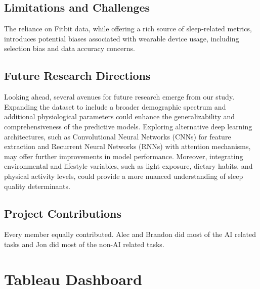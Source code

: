\documentclass[10pt]{extarticle}
\begin{document}



\subsection{Limitations and Challenges}

The reliance on Fitbit data, while offering a rich source of sleep-related metrics, introduces potential biases associated with wearable device usage, including selection bias and data accuracy concerns.

\subsection{Future Research Directions}

Looking ahead, several avenues for future research emerge from our study. Expanding the dataset to include a broader demographic spectrum and additional physiological parameters could enhance the generalizability and comprehensiveness of the predictive models. Exploring alternative deep learning architectures, such as Convolutional Neural Networks (CNNs) for feature extraction and Recurrent Neural Networks (RNNs) with attention mechanisms, may offer further improvements in model performance. Moreover, integrating environmental and lifestyle variables, such as light exposure, dietary habits, and physical activity levels, could provide a more nuanced understanding of sleep quality determinants.

\subsection{Project Contributions}

Every member equally contributed. Alec and Brandon did most of the AI related tasks and Jon did most of the non-AI related tasks.

\section{Tableau Dashboard}
\end{document}
